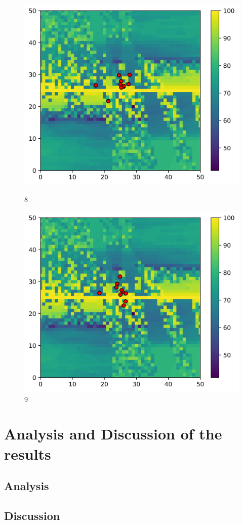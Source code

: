 \begin{figure}[H]
			\centering
	\begin{minipage}{0.5\textwidth}
		\includegraphics[width=\textwidth]{figures/swarm/8.png}
		\caption{8}
		\label{8}
	\end{minipage}\hfill
	\begin{minipage}{0.5\textwidth}
		\includegraphics[width=\textwidth]{figures/swarm/9.png}
		\caption{9}
		\label{9}
	\end{minipage}\par
\end{figure}


\newpage
\section{Analysis and Discussion of the results}%


\subsection{Analysis}
\subsection{Discussion}%